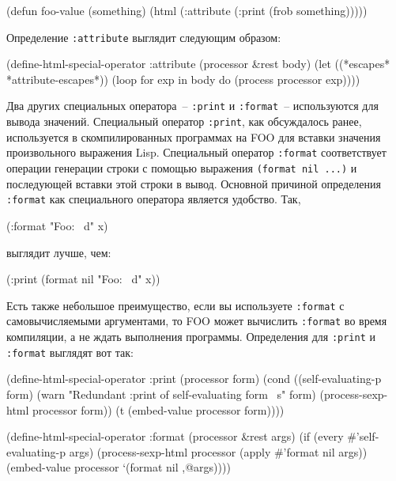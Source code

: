 \begin{myverb}
(defun foo-value (something)
  (html (:attribute (:print (frob something)))))
\end{myverb}

Определение \lstinline{:attribute} выглядит следующим образом:

\begin{myverb}
(define-html-special-operator :attribute (processor &rest body)
  (let ((*escapes* *attribute-escapes*))
    (loop for exp in body do (process processor exp))))
\end{myverb}

Два других специальных оператора~-- \lstinline{:print} и \lstinline{:format}~-- используются для
вывода значений.  Специальный оператор \lstinline{:print}, как обсуждалось ранее, используется
в скомпилированных программах на FOO для вставки значения произвольного выражения Lisp.
Специальный оператор \lstinline{:format} соответствует операции генерации строки с помощью
выражения \lstinline{(format nil ...)} и последующей вставки этой строки в вывод.  Основной
причиной определения \lstinline{:format} как специального оператора является удобство.  Так,

\begin{myverb}
(:format "Foo: ~d" x)
\end{myverb}

\noindent{}выглядит лучше, чем:

\begin{myverb}
(:print (format nil "Foo: ~d" x))
\end{myverb}

Есть также небольшое преимущество, если вы используете \lstinline{:format} с самовычисляемыми
аргументами, то FOO может вычислить \lstinline{:format} во время
компиляции, а не ждать выполнения программы.  Определения для \lstinline{:print} и
\lstinline{:format} выглядят вот так:

\begin{myverb}
(define-html-special-operator :print (processor form)
  (cond
    ((self-evaluating-p form)
     (warn "Redundant :print of self-evaluating form ~s" form)
     (process-sexp-html processor form))
    (t
     (embed-value processor form))))

(define-html-special-operator :format (processor &rest args)
  (if (every #'self-evaluating-p args)
    (process-sexp-html processor (apply #'format nil args))
    (embed-value processor `(format nil ,@args))))
\end{myverb}

